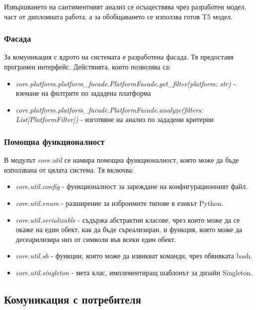 \documentclass{article}
\begin{document}
Извършването на сантиментният анализ се осъществява чрез разработен модел, част от дипломната работа, а за обобщаването
се използва готов T5 модел.

\subsubsection{Фасада}

За комуникация с ядрото на системата е разработена фасада. Тя предоставя програмен интерфейс. Действията, които
позволява са:

\begin{itemize}
\item \textit{core.platform.platform\_facade.PlatformFacade.get\_filter(platform: str)} - вземане на филтрите по
зададена платформа
\item \textit{core.platform.platform\_facade.PlatformFacade.analyze(filters: List[PlatformFilter])} - изготвяне на
анализ по зададени критерии
\end{itemize}

\subsubsection{Помощна функционалност}

В модулът \textit{core.util} се намира помощна функционалност, която може да бъде използвана от цялата система. Тя
включва:

\begin{itemize}
\item \textit{core.util.config} - функционалност за зареждане на конфигурационният файл.
\item \textit{core.util.enum} - разширение за изброимите типове в езикът Python.
\item \textit{core.util.serializable} - съдържа абстрактни класове, чрез които може да се окаже на един обект, как
да бъде съреализиран, и функция, която може да десеарилизира низ от символи във всеки един обект.
\item \textit{core.util.sh} - функции, които може да извикват команди, чрез обвивката bash.
\item \textit{core.util.singleton} - мета клас, имплементиращ шаблонът за дизайн Singleton.
\end{itemize}

\subsection{Комуникация с потребителя}
\end{document}
